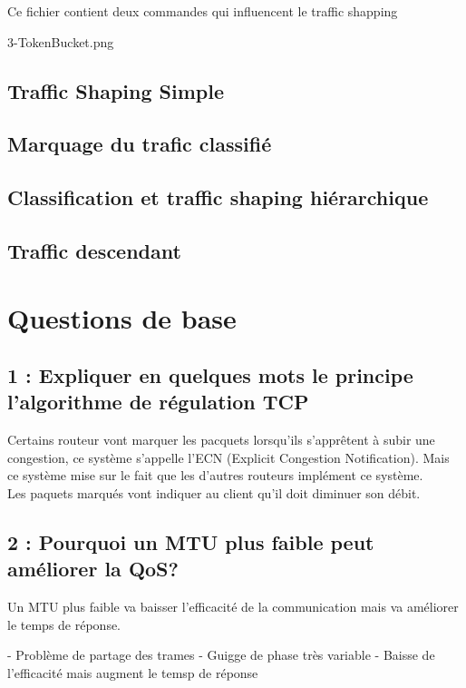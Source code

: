 \documentclass{article}
\begin{document}
Ce fichier contient deux commandes qui influencent le traffic shapping

3-TokenBucket.png

\subsection{Traffic Shaping Simple}

\subsection{Marquage du trafic classifié}

\subsection{Classification et traffic shaping hiérarchique}

\subsection{Traffic descendant}

\section{Questions de base}

\subsection*{1 : Expliquer en quelques mots le principe l'algorithme de régulation TCP}

Certains routeur vont marquer les pacquets lorsqu'ils s'apprêtent à subir une congestion, ce système s'appelle l'ECN (Explicit Congestion Notification). Mais ce système mise sur le fait que les d'autres routeurs implément ce système. \cite{cours}\\

Les paquets marqués vont indiquer au client qu'il doit diminuer son débit.

\subsection*{2 : Pourquoi un MTU plus faible peut améliorer la QoS?}

Un MTU plus faible va baisser l'efficacité de la communication mais va améliorer le temps de réponse.

- Problème de partage des trames
- Guigge de phase très variable
- Baisse de l'efficacité mais augment le temsp de réponse
\end{document}
